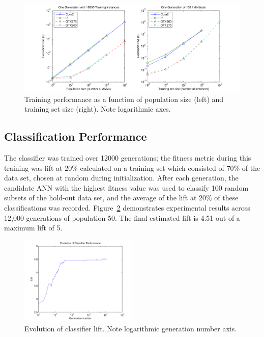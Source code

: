 \documentclass[11pt]{article}       %
\begin{document}
\begin{figure}[h]
	\centering
	\includegraphics[width=\textwidth]{fig-performance}
	\caption{Training performance as a function of population size (left) and training set size (right). Note logarithmic axes.}
	\label{fig:training-performance}
\end{figure}

\subsection{Classification Performance} \label{results}
The classifier was trained over 12000 generations; the fitness metric during this training was lift at 20\% calculated on a training set which consisted of 70\% of the data set, chosen at random during initialization.  After each generation, the candidate ANN with the highest fitness value was used to classify 100 random subsets of the hold-out data set, and the average of the lift at 20\% of these classifications was recorded.  Figure~\ref{fig:evolution-lift} demonstrates experimental results across 12,000 generations of population 50. The final estimated lift is 4.51 out of a maximum lift of 5.

\begin{figure}[h]
	\centering
	\includegraphics[width=0.5\textwidth]{fig-evolution-lift}
	\caption{Evolution of classifier lift. Note logarithmic generation number axis.}
	\label{fig:evolution-lift}
\end{figure}
\end{document}
